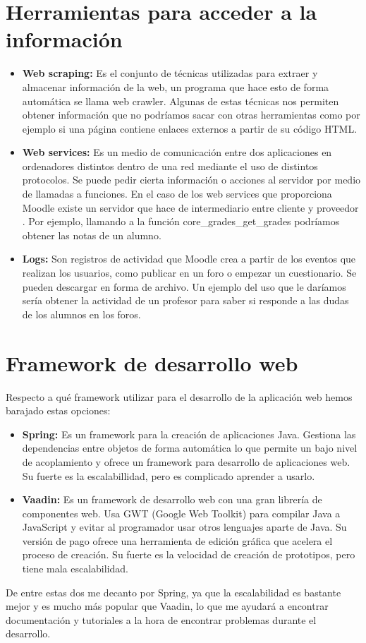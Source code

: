 \section{Herramientas para acceder a la información}
\begin{itemize}
	\item \textbf{Web scraping:}
	Es el conjunto de técnicas utilizadas para extraer y almacenar información de la web, un programa que hace esto de forma automática se llama web crawler. Algunas de estas técnicas nos permiten obtener información que no podríamos sacar con otras herramientas como por ejemplo si una página contiene enlaces externos a partir de su código HTML.
	\item \textbf{Web services:}
	Es un medio de comunicación entre dos aplicaciones en ordenadores distintos dentro de una red mediante el uso de distintos protocolos. Se puede pedir cierta información o acciones al servidor por medio de llamadas a funciones. En el caso de los web services que proporciona Moodle existe un servidor que hace de intermediario entre cliente y proveedor \cite{moodle-2020}. Por ejemplo, llamando a la función core\_grades\_get\_grades podríamos obtener las notas de un alumno.
	\item \textbf{Logs:}
	Son registros de actividad que Moodle crea a partir de los eventos que realizan los usuarios, como publicar en un foro o empezar un cuestionario. Se pueden descargar en forma de archivo. Un ejemplo del uso que le daríamos sería obtener la actividad de un profesor para saber si responde a las dudas de los alumnos en los foros.
\end{itemize}
\section{Framework de desarrollo web}
Respecto a qué framework utilizar para el desarrollo de la aplicación web hemos barajado estas opciones:
\begin{itemize}
	\item \textbf{Spring:}
	Es un framework para la creación de aplicaciones Java. Gestiona las dependencias entre objetos de forma automática lo que permite un bajo nivel de acoplamiento y ofrece un framework para desarrollo de aplicaciones web. Su fuerte es la escalabillidad, pero es complicado aprender a usarlo.
	\item \textbf{Vaadin:}
	Es un framework de desarrollo web con una gran librería de componentes web. Usa GWT (Google Web Toolkit) para compilar Java a JavaScript y evitar al programador usar otros lenguajes aparte de Java. Su versión de pago ofrece una herramienta de edición gráfica que acelera el proceso de creación. Su fuerte es la velocidad de creación de prototipos, pero tiene mala escalabilidad.
\end{itemize}

De entre estas dos me decanto por Spring, ya que la escalabilidad es bastante mejor y es mucho más popular que Vaadin, lo que me ayudará a encontrar documentación y tutoriales a la hora de encontrar problemas durante el desarrollo.